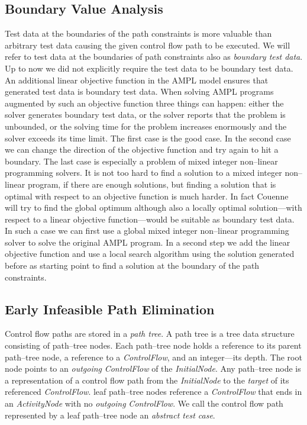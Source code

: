 \documentclass[runningheads,a4paper]{llncs}%
\newcommand{\UMLType}[1]{\textsf{\textit{#1}}} %
\newcommand{\UMLReference}[1]{\textsf{\textit{#1}}} %
\begin{document}
\subsection{Boundary Value Analysis}%
\label{sec:BoundaryValueAnalysis}%
Test data at the boundaries of the path constraints is more valuable than
arbitrary test data causing the given control flow path to be executed. We will
refer to test data at the boundaries of path constraints also as \emph{boundary
test data}. Up to now we did not explicitly require the test data to be boundary test data. An additional linear objective
function in the AMPL model ensures that generated test data is boundary test data. When solving AMPL programs augmented by such an
objective function three things can happen: either the solver generates boundary
test data, or the solver reports that the problem is unbounded, or the solving
time for the problem increases enormously and the solver exceeds its time limit.
The first case is the good case. In the second case we can change the direction
of the objective function and try again to hit a boundary. The last case is
especially a problem of mixed integer non--linear programming solvers. It is not
too hard to find a solution to a mixed integer non--linear program, if there are
enough solutions, but finding a solution that is optimal with respect to an
objective function is much harder. In fact Couenne will try to find the
global optimum although also a locally optimal solution---with respect to a
linear objective function---would be suitable as boundary test data. In such a
case we can first use a global mixed integer non--linear programming solver to
solve the original AMPL program. In a second step we add the linear objective
function and use a local search algorithm using the solution generated before as
starting point to find a solution at the boundary of the path constraints.
\subsection{Early Infeasible Path Elimination}%
\label{sec:InfeasiblePathElimination}%
Control flow paths are stored in a \emph{path tree}. A path tree is a tree data
structure consisting of path--tree nodes. Each path--tree node holds a reference
to its parent path--tree node, a reference to a \UMLType{ControlFlow}, and an
integer---its depth. The root node points to an \UMLReference{outgoing}
\UMLType{ControlFlow} of the \UMLType{InitialNode}. Any path--tree node is a
representation of a control flow path from the \UMLType{InitialNode} to the
\UMLReference{target} of its referenced \UMLType{ControlFlow}. leaf path--tree
nodes reference a \UMLType{ControlFlow} that ends in an \UMLType{ActivityNode}
with no \UMLReference{outgoing} \UMLType{ControlFlow}. We call the control flow
path represented by a leaf path--tree node an \emph{abstract test case}.
\end{document}
